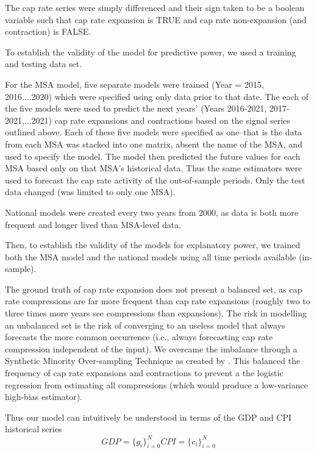 \documentclass[jrfm,article,submit,oneauthor,pdftex]{Definitions/mdpi}
\begin{document}
The cap rate series were simply differenced and their sign taken to be a boolean variable such that cap rate expansion is TRUE and cap rate non-expansion (and contraction) is FALSE.

To establish the validity of the model for predictive power, we used a training and testing data set.

For the MSA model, five separate models were trained (Year = 2015, 2016....2020) which were specified using only data prior to that date. The each of the five models were used to predict the next years' (Years 2016-2021, 2017-2021,...2021) cap rate expansions and contractions based on the signal series outlined above. Each of these five models were specified as one--that is the data from each MSA was stacked into one matrix, absent the name of the MSA, and used to specify the model. The model then predicted the future values for each MSA based only on that MSA's historical data. Thus the same estimators were used to forecast the cap rate activity of the out-of-sample periods. Only the test data changed (was limited to only one MSA).

National models were created every two years from 2000, as data is both more frequent and longer lived than MSA-level data. 

Then, to establish the validity of the models for explanatory power, we trained both the MSA model and the national models using all time periods available (in-sample).

The ground truth of cap rate expansion does not present a balanced set, as cap rate compressions are far more frequent than cap rate expansions (roughly two to three times more years see compressions than expansions). The risk in modelling an unbalanced set is the risk of converging to an useless model that always forecasts the more common occurrence (i.e., always forecasting cap rate compression independent of the input). We overcame the imbalance through a Synthetic Minority Over-sampling Technique as created by \citep*{SMOTE}. This balanced the frequency of cap rate expansions and contractions to prevent a the logistic regression from estimating all compressions (which would produce a low-variance high-bias estimator).

\pagebreak

Thus our model can intuitively be understood in terms of the GDP and CPI historical series
\begin{equation}
GDP = \{g_i\}_{i=0}^N 
CPI = \{c_i\}_{i=0}^N 
\end{equation}
\end{document}
